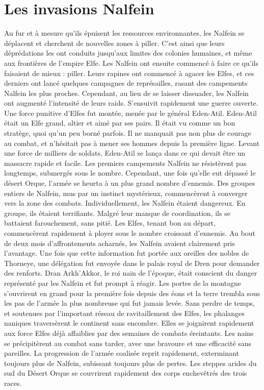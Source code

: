 \section{Les invasions Nalfein}
Au fur et à mesure qu'ils épuisent les ressources environnantes, les Nalfein se déplacent et cherchent de nouvelles zones à piller. C'est ainsi que leurs déprédations les ont conduits jusqu'aux limites des colonies humaines, et même aux frontières de l'empire Elfe. Les Nalfein ont ensuite commencé à faire ce qu'ils faisaient de mieux : piller. Leurs rapines ont commencé à agacer les Elfes, et ces derniers ont lancé quelques campagnes de représailles, rasant des campements Nalfein les plus proches. Cependant, au lieu de se laisser dissuader, les Nalfein ont augmenté l'intensité de leurs raids. S'ensuivit rapidement une guerre ouverte. Une force punitive d'Elfes fut montée, menée par le général Eden-Atil. 
\newline
Eden-Atil était un Elfe grand, altier et aimé par ses pairs. Il était vu comme un bon stratège, quoi qu'un peu borné parfois. Il ne manquait pas non plus de courage au combat, et n'hésitait pas à mener ses hommes depuis la première ligne. Levant une force de milliers de soldats, Eden-Atil se lança dans ce qui devait être un massacre rapide et facile. Les premiers campements Nalfein ne résistèrent pas longtemps, submergés sous le nombre. Cependant, une fois qu'elle eut dépassé le désert Orque, l'armée se heurta à un plus grand nombre d'ennemis. Des groupes entiers de Nalfein, mus par un instinct mystérieux, commencèrent à converger vers la zone des combats. Individuellement, les Nalfein étaient dangereux. En groupe, ils étaient terrifiants. Malgré leur manque de coordination, ils se battaient farouchement, sans pitié. Les Elfes, tenant bon au départ, commencèrent rapidement à ployer sous le nombre croissant d'ennemis. Au bout de deux mois d'affrontements acharnés, les Nalfein avaient clairement pris l'avantage. Une fois que cette information fut portée aux oreilles des nobles de Thorneye, une délégation fut envoyée dans le palais royal de Dren pour demander des renforts. Dran Arkh'Akkor, le roi nain de l'époque, était conscient du danger représenté par les Nalfein et fut prompt à réagir. Les portes de la montagne s'ouvrirent en grand pour la première fois depuis des éons et la terre trembla sous les pas de l'armée la plus nombreuse qui fut jamais levée. Sans perdre de temps, et soutenues par l'important réseau de ravitaillement des Elfes, les phalanges naniques traversèrent le continent sans encombre. Elles se joignirent rapidement aux force Elfes déjà affaiblies par des semaines de combats éreintants. Les nains se précipitèrent au combat sans tarder, avec une bravoure et une efficacité sans pareilles. La progression de l'armée coalisée reprit rapidement, exterminant toujours plus de Nalfein, subissant toujours plus de pertes. Les steppes arides du sud du Désert Orque se couvrirent rapidement des corps enchevêtrés des trois races.